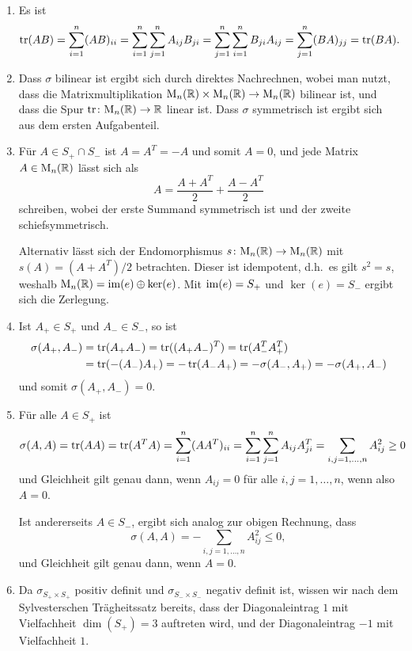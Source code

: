 \documentclass[a4paper, 10pt]{scrartcl}
\begin{document}
\begin{solution}
  \begin{enumerate}[leftmargin=*]
    \item
      Es ist
      \[
          \operatorname{tr}(AB)
        = \sum_{i=1}^n (AB)_{ii}
        = \sum_{i=1}^n \sum_{j=1}^n A_{ij} B_{ji}
        = \sum_{j=1}^n \sum_{i=1}^n B_{ji} A_{ij}
        = \sum_{j=1}^n (BA)_{jj}
        = \operatorname{tr}(BA).
      \]
    \item
      Dass $\sigma$ bilinear ist ergibt sich durch direktes Nachrechnen, wobei man nutzt, dass die Matrixmultiplikation $\mathrm{M}_n(\mathbb{R}) \times \mathrm{M}_n(\mathbb{R}) \to \mathrm{M}_n(\mathbb{R})$ bilinear ist, und dass die Spur $\operatorname{tr} \colon \mathrm{M}_n(\mathbb{R}) \to \mathbb{R}$ linear ist.
      Dass $\sigma$ symmetrisch ist ergibt sich aus dem ersten Aufgabenteil.
    \item
      Für $A \in S_+ \cap S_-$ ist $A = A^T = -A$ und somit $A = 0$, und jede Matrix $A \in \mathrm{M}_n(\mathbb{R})$ lässt sich als
      \[
        A = \frac{A + A^T}{2} + \frac{A - A^T}{2}
      \]
      schreiben, wobei der erste Summand symmetrisch ist und der zweite schiefsymmetrisch.
      
      Alternativ lässt sich der Endomorphismus $s \colon \mathrm{M}_n(\mathbb{R}) \to \mathrm{M}_n(\mathbb{R})$ mit $s(A) = (A + A^T)/2$ betrachten.
      Dieser ist idempotent, d.h.\ es gilt $s^2 = s$, weshalb $\mathrm{M}_n(\mathbb{R}) = \operatorname{im}(e) \oplus \ker(e)$.
      Mit $\operatorname{im}(e) = S_+$ und $\ker(e) = S_-$ ergibt sich die Zerlegung.
    \item
      Ist $A_+ \in S_+$ und $A_- \in S_-$, so ist
      \begin{align*}
             \sigma(A_+, A_-)
        &=   \operatorname{tr}( A_+ A_- )
         =   \operatorname{tr}( (A_+ A_-)^T )
         =   \operatorname{tr}( A_-^T A_+^T ) \\
        &=   \operatorname{tr}( -(A_-) A_+ )
         =  -\operatorname{tr}( A_- A_+)
         =  -\sigma(A_-, A_+)
         =  -\sigma(A_+, A_-)
      \end{align*}
      und somit $\sigma(A_+, A_-) = 0$.
    \item
      Für alle $A \in S_+$ ist
      \[
              \sigma(A, A)
        =     \operatorname{tr}(A A)
        =     \operatorname{tr}(A^T A)
        =     \sum_{i=1}^n (A A^T)_{ii}
        =     \sum_{i=1}^n \sum_{j=1}^n A_{ij} A^T_{ji}
        =     \sum_{i,j = 1, \dotsc, n} A_{ij}^2
        \geq  0
      \]
      und Gleichheit gilt genau dann, wenn $A_{ij} = 0$ für alle $i,j = 1, \dotsc, n$, wenn also $A = 0$.
      
      Ist andererseits $A \in S_-$, ergibt sich analog zur obigen Rechnung, dass
      \[
                \sigma(A, A)
        =     - \sum_{i, j = 1, \dotsc, n} A_{ij}^2
        \leq    0,
      \]
      und Gleichheit gilt genau dann, wenn $A = 0$.
    \item
      Da $\sigma_{S_+ \times S_+}$ positiv definit und $\sigma_{S_- \times S_-}$ negativ definit ist, wissen wir nach dem Sylvesterschen Trägheitssatz bereits, dass der Diagonaleintrag $1$ mit Vielfachheit $\dim(S_+) = 3$ auftreten wird, und der Diagonaleintrag $-1$ mit Vielfachheit $1$.
      

\end{enumerate}
\end{solution}
\end{document}
